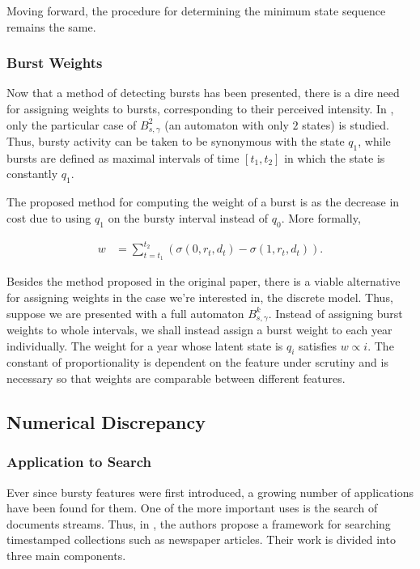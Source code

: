 Moving forward, the procedure for determining the minimum state sequence remains the same.

\subsubsection{Burst Weights}

Now that a method of detecting bursts has been presented, there is a dire need for assigning weights to bursts, corresponding to their perceived intensity. In \cite{Kleinberg:2002:BHS:775047.775061}, only the particular case of $B_{s, \gamma}^2$ (an automaton with only $2$ states) is studied. Thus, bursty activity can be taken to be synonymous with the state $q_1$, while bursts are defined as maximal intervals of time $\left[ t_1, t_2 \right]$ in which the state is constantly $q_1$.

The proposed method for computing the weight of a burst is as the decrease in cost due to using $q_1$ on the bursty interval instead of $q_0$. More formally,

\begin{align}
\label{eq:automaton-burst-weights}
w &= \sum_{t=t_1}^{t_2} \left( \sigma \left( 0, r_t, d_t \right) - \sigma \left( 1, r_t, d_t \right) \right).
\end{align}

Besides the method proposed in the original paper, there is a viable alternative for assigning weights in the case we're interested in, the discrete model. Thus, suppose we are presented with a full automaton $B_{s, \gamma}^{k}$. Instead of assigning burst weights to whole intervals, we shall instead assign a burst weight to each year individually. The weight for a year whose latent state is $q_i$ satisfies $w \propto i$. The constant of proportionality is dependent on the feature under scrutiny and is necessary so that weights are comparable between different features.

\subsection{Numerical Discrepancy}
\label{subsec:bf-discrepancy}

\subsubsection{Application to Search}

Ever since bursty features were first introduced, a growing number of applications have been found for them. One of the more important uses is the search of documents streams. Thus, in \cite{Lappas:2009:BSD:1557019.1557075}, the authors propose a framework for searching timestamped collections such as newspaper articles. Their work is divided into three main components.


